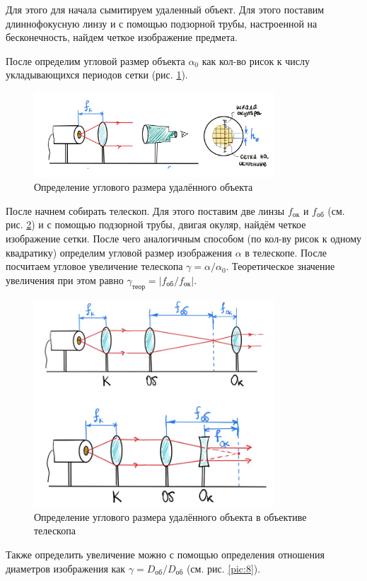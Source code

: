 \documentclass[a4paper,12pt]{article}
\theoremstyle{definition}
\begin{document}
Для этого для начала сымитируем удаленный объект. Для этого поставим длиннофокусную линзу и с помощью подзорной трубы, настроенной на бесконечность, найдем четкое изображение предмета. 

После определим угловой размер объекта $\alpha_0$ как кол-во рисок к числу укладывающихся периодов сетки (рис. \ref{pic:6}).

\begin{figure}[h!]
    \centering
    \includegraphics[width=9cm]{6.jpg}
    \caption{Определение углового размера удалённого объекта}\label{pic:6}
\end{figure}
После начнем собирать телескоп. Для этого поставим две линзы $f_\text{ок}$ и $f_\text{об}$ (см. рис. \ref{pic:7}) и с помощью подзорной трубы, двигая окуляр, найдём четкое изображение сетки. После чего аналогичным способом (по кол-ву рисок к одному квадратику) определим угловой размер изображения $\alpha$ в телескопе. После посчитаем угловое увеличение телескопа $\gamma = \alpha / \alpha_0$. Теоретическое значение увеличения при этом равно $\gamma_\text{теор}= |f_\text{об} / f_\text{ок}|$.

\begin{figure}[h!]
    \centering
    \includegraphics[width=9cm]{7.jpg}
    \caption{Определение углового размера удалённого объекта в объективе телескопа}\label{pic:7}
\end{figure}

Также определить увеличение можно с помощью определения отношения диаметров изображения как $\gamma = D_\text{об} / D_\text{об}$ (см. рис. \ref{pic:8}).
\end{document}
